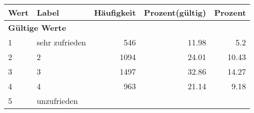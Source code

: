      \begin{longtable}{lXrrr}
     \toprule
     \textbf{Wert} & \textbf{Label} & \textbf{Häufigkeit} & \textbf{Prozent(gültig)} & \textbf{Prozent} \\
     \endhead
     \midrule
     \multicolumn{5}{l}{\textbf{Gültige Werte}}\\

     1 &
     \multicolumn{1}{X}{ sehr zufrieden   } &


       \num{546} &
       \num[round-mode=places,round-precision=2]{11.98} &
         \num[round-mode=places,round-precision=2]{5.2} \\

     2 &
     \multicolumn{1}{X}{ 2   } &


       \num{1094} &
       \num[round-mode=places,round-precision=2]{24.01} &
         \num[round-mode=places,round-precision=2]{10.43} \\

     3 &
     \multicolumn{1}{X}{ 3   } &


       \num{1497} &
       \num[round-mode=places,round-precision=2]{32.86} &
         \num[round-mode=places,round-precision=2]{14.27} \\

     4 &
     \multicolumn{1}{X}{ 4   } &


       \num{963} &
       \num[round-mode=places,round-precision=2]{21.14} &
         \num[round-mode=places,round-precision=2]{9.18} \\

     5 &
     \multicolumn{1}{X}{ unzufrieden   } &



\end{longtable}
